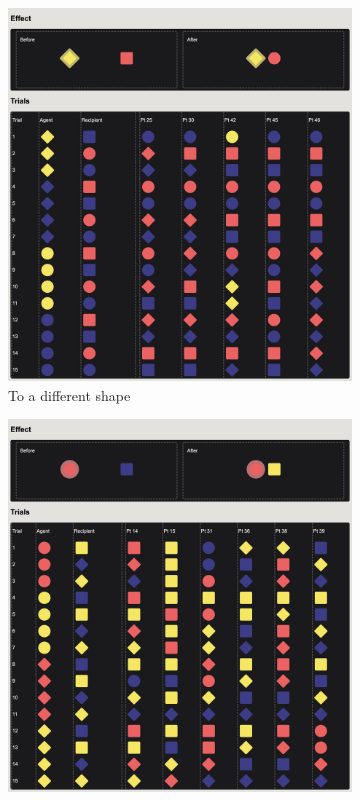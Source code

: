 \documentclass{article}
\begin{document}
\begin{figure}[b]
  \vspace{1cm}
  \begin{subfigure}[t]{0.31\textwidth}
  	\centering
  	\includegraphics[width=\linewidth]{group02} 
  	\caption{To a different shape} \label{fig:group02}
  \end{subfigure}
  \hfill
  \begin{subfigure}[t]{0.31\textwidth}
  	\centering
  	\includegraphics[width=\linewidth]{group04} 

\end{subfigure}
\end{figure}
\end{document}
